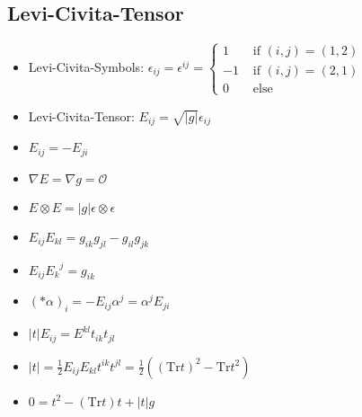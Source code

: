 \documentclass{scrartcl}
\newlength{\wlen}
\newcommand{\upperleft}[2]{\,\settowidth{\wlen}{$#2$}\hspace{-\wlen}\mbox{$\phantom{#2}$}^{#1}{#2}}
\newcommand{\lflat}[1]{\upperleft{\flat}{#1}}
\newcommand{\fstensor}[3]{{{#1}_{#2}}^{#3}}
\newcommand{\ffbasis}[2]{dx^{#1} \otimes dx^{#2}}
\begin{document}
    \subsection{Levi-Civita-Tensor}
      \begin{itemize}
        \item Levi-Civita-Symbols: 
             \( \epsilon_{ij} = \epsilon^{ij} =  
                  \begin{cases}
                    1 & \text{ if } (i,j)=(1,2) \\
                    -1 & \text{ if } (i,j)=(2,1) \\
                    0 & \text{ else}
                  \end{cases}\) 
        \item Levi-Civita-Tensor:
              \( E_{ij} = \sqrt{|g|}\epsilon_{ij} \)
        \item \( E_{ij} = -E_{ji} \)
        \item \( \nabla E = \nabla g = \mathcal{O} \)
        \item \( E\otimes E = |g| \epsilon \otimes \epsilon\)
        \item \( E_{ij}E_{kl} = g_{ik}g_{jl} - g_{il}g_{jk} \)
        \item \( E_{ij}\fstensor{E}{k}{j} = g_{ik} \)
        \item \( (*\alpha)_{i} = -E_{ij}\alpha^{j} = \alpha^{j}E_{ji}  \)
        \item \( |t|E_{ij} = E^{kl}t_{ik}t_{jl} \)
        \item \( |t| = \frac{1}{2} E_{ij}E_{kl} t^{ik}t^{jl} = \frac{1}{2} \left( (\text{Tr}t)^{2} - \text{Tr}t^{2} \right) \)
        \item \( 0 = t^{2} - (\text{Tr}t)t + |t|g \)
      \end{itemize}

    
\end{document}
